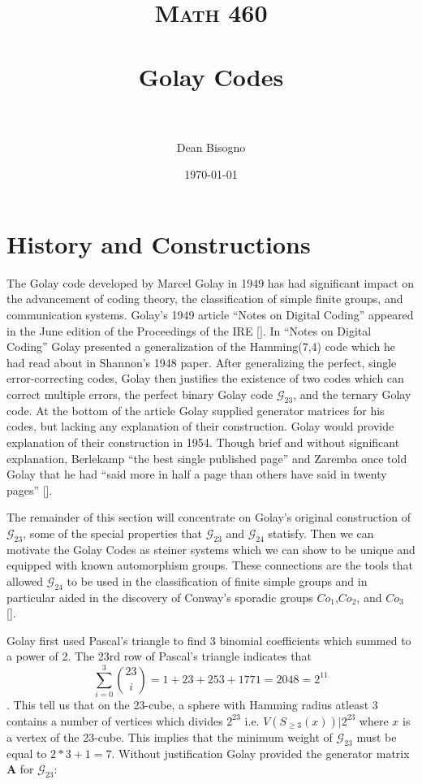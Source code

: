 \documentclass[paper=a4, fontsize=11pt]{scrartcl} %
\title{	
\normalfont \normalsize 
\textsc{Math 460} \\ [25pt] %
\horrule{0.5pt} \\[0.4cm] %
\huge Golay Codes\\ %
\horrule{2pt} \\[0.5cm] %
}
\author{Dean Bisogno} %
\date{\normalsize\today} %
\numberwithin{equation}{section} %
\numberwithin{figure}{section} %
\numberwithin{table}{section} %
\begin{document}
\maketitle %

\section{History and Constructions}

The Golay code developed by Marcel Golay in 1949 has had significant impact on the advancement of coding theory, the classification of simple finite groups, and communication systems. Golay's 1949 article ``Notes on Digital Coding'' appeared in the June edition of the Proceedings of the IRE [\cite{golay}]. In ``Notes on Digital Coding'' Golay presented a generalization of the Hamming(7,4) code which he had read about in Shannon's 1948 paper. After generalizing the perfect, single error-correcting codes, Golay then justifies the existence of two codes which can correct multiple errors, the perfect binary Golay code $\mathcal{G}_{23}$, and the ternary Golay code. At the bottom of the article Golay supplied generator matrices for his codes, but lacking any explanation of their construction. Golay would provide explanation of their construction in 1954. Though brief and without significant explanation, Berlekamp ``the best single published page'' and Zaremba once told Golay that he had ``said more in half a page than others have said in twenty pages'' [\cite{thompson}].

The remainder of this section will concentrate on Golay's original construction of $\mathcal{G}_{23}$, some of the special properties that $\mathcal{G}_{23}$ and $\mathcal{G}_{24}$ statisfy. Then we can motivate the Golay Codes as steiner systems which we can show to be unique and equipped with known automorphism groups. These connections are the tools that allowed $\mathcal{G}_{24}$ to be used in the classification of finite simple groups and in particular aided in the discovery of Conway's sporadic groups $Co_1$,$Co_2$, and $Co_3$ [\cite{thompson}]. 


Golay first used Pascal's triangle to find 3 binomial coefficients which summed to a power of 2. The 23rd row of Pascal's triangle indicates that
$$\sum_{i=0}^3 {23 \choose i} = 1+23+253+1771 = 2048 = 2^{11}$$. This tell us that on the 23-cube, a sphere with Hamming radius atleast 3 contains a number of vertices which divides $2^{23}$ i.e. $V(S_{\geq 3}(x) )|2^{23}$ where $x$ is a vertex of the 23-cube. This implies that the minimum weight of $\mathcal{G}_{23}$ must be equal to $2*3+1=7$. Without justification Golay provided the generator matrix $\mathbf{A}$ for $\mathcal{G}_{23}$:
\end{document}
